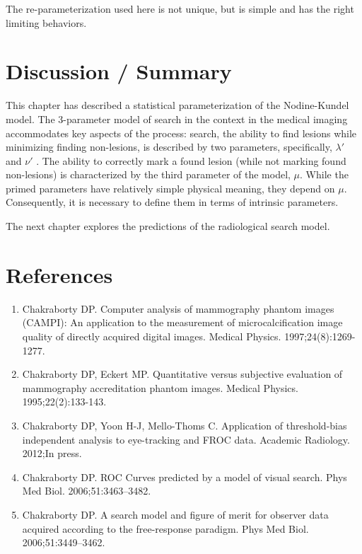 \documentclass[
]{book}
\providecommand{\tightlist}{%
  \setlength{\itemsep}{0pt}\setlength{\parskip}{0pt}}
\begin{document}
The re-parameterization used here is not unique, but is simple and has the right limiting behaviors.

\hypertarget{rsm-discussion-summary}{%
\section{Discussion / Summary}\label{rsm-discussion-summary}}

This chapter has described a statistical parameterization of the Nodine-Kundel model. The 3-parameter model of search in the context in the medical imaging accommodates key aspects of the process: search, the ability to find lesions while minimizing finding non-lesions, is described by two parameters, specifically, \(\lambda'\) and \(\nu'\) . The ability to correctly mark a found lesion (while not marking found non-lesions) is characterized by the third parameter of the model, \(\mu\). While the primed parameters have relatively simple physical meaning, they depend on \(\mu\). Consequently, it is necessary to define them in terms of intrinsic parameters.

The next chapter explores the predictions of the radiological search model.

\hypertarget{rsm-references}{%
\section{References}\label{rsm-references}}

\begin{enumerate}
\def\labelenumi{\arabic{enumi}.}
\tightlist
\item
  Chakraborty DP. Computer analysis of mammography phantom images (CAMPI): An application to the measurement of microcalcification image quality of directly acquired digital images. Medical Physics. 1997;24(8):1269-1277.
\item
  Chakraborty DP, Eckert MP. Quantitative versus subjective evaluation of mammography accreditation phantom images. Medical Physics. 1995;22(2):133-143.
\item
  Chakraborty DP, Yoon H-J, Mello-Thoms C. Application of threshold-bias independent analysis to eye-tracking and FROC data. Academic Radiology. 2012;In press.
\item
  Chakraborty DP. ROC Curves predicted by a model of visual search. Phys Med Biol. 2006;51:3463--3482.
\item
  Chakraborty DP. A search model and figure of merit for observer data acquired according to the free-response paradigm. Phys Med Biol. 2006;51:3449--3462.
\end{enumerate}
\end{document}
